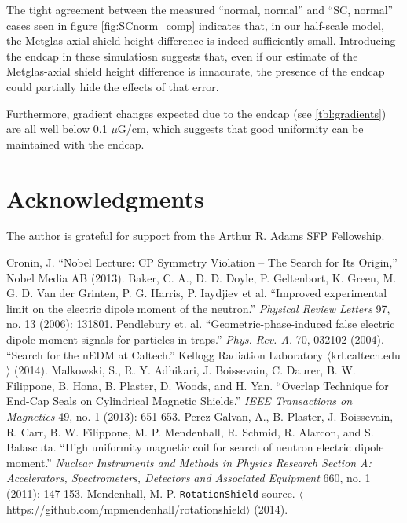\documentclass[twocolumn,aps,prb,citeautoscript]{revtex4-1}
\begin{document}
The tight agreement between the measured ``normal, normal'' and ``SC, normal'' cases seen in figure
\ref{fig:SCnorm_comp} indicates that, in our half-scale model, the Metglas-axial shield height difference is
indeed sufficiently small. Introducing the endcap in these simulatiosn suggests that, even if our estimate of
the Metglas-axial shield height difference is innacurate, the presence of the endcap could partially hide the effects
of that error.

Furthermore, gradient changes expected due to the endcap (see \ref{tbl:gradients}) are all well below 0.1 $\mu$G/cm,
which suggests that
good uniformity can be maintained with the endcap.

\section{Acknowledgments}

The author is grateful for support from the Arthur R. Adams SFP Fellowship.

\begin{thebibliography}{}
 Cronin, J. ``Nobel Lecture: CP Symmetry Violation – The Search
for Its Origin,'' Nobel Media AB (2013).
 Baker, C. A., D. D. Doyle, P. Geltenbort, K. Green, M. G. D. Van der Grinten, P. G. Harris, P. Iaydjiev et al. ``Improved experimental limit on the electric dipole moment of the neutron.'' \textit{Physical Review Letters} 97, no. 13 (2006): 131801.
 Pendlebury et. al. ``Geometric-phase-induced false electric dipole moment signals for particles in traps.'' \textit{Phys. Rev. A.} 70, 032102 (2004).
 ``Search for the nEDM at Caltech.'' Kellogg Radiation Laboratory
$\langle$krl.caltech.edu$\rangle$ (2014).
 Malkowski, S., R. Y. Adhikari, J. Boissevain, C. Daurer, B. W. Filippone, B. Hona, B. Plaster, D. Woods, and H. Yan. ``Overlap Technique for End-Cap Seals on Cylindrical Magnetic Shields.'' \textit{IEEE Transactions on Magnetics} 49, no. 1 (2013): 651-653.
 Perez Galvan, A., B. Plaster, J. Boissevain, R. Carr, B. W. Filippone, M. P. Mendenhall, R. Schmid, R. Alarcon, and S. Balascuta. ``High uniformity magnetic coil for search of neutron electric dipole moment.'' \textit{Nuclear Instruments and Methods in Physics Research Section A: Accelerators, Spectrometers, Detectors and Associated Equipment} 660, no. 1 (2011): 147-153.
 Mendenhall, M. P. \texttt{RotationShield} source. $\langle$https://github.com/mpmendenhall/rotationshield$\rangle$ (2014).
\end{thebibliography}
\end{document}
